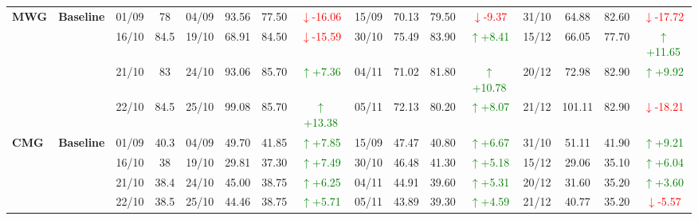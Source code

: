 \documentclass{ieeeaccess}
\begin{document}
{\begin{longtable}{llcc|cccc|cccc|cccc}
\multirow{4}{*}{\textbf{MWG}}
& \textbf{Baseline}
& 01/09 & 78 & 04/09 & 93.56 & 77.50 & \textcolor{red}{\(\downarrow\)-16.06} & 15/09 & 70.13 & 79.50 & \textcolor{red}{\(\downarrow\)-9.37} & 31/10 & 64.88 & 82.60 & \textcolor{red}{\(\downarrow\)-17.72} \\
& & 16/10 & 84.5 & 19/10 & 68.91 & 84.50 & \textcolor{red}{\(\downarrow\)-15.59} & 30/10 & 75.49 & 83.90 & \textcolor{green}{\(\uparrow\)+8.41} & 15/12 & 66.05 & 77.70 & \textcolor{green}{\(\uparrow\)+11.65} \\
& & 21/10 & 83 & 24/10 & 93.06 & 85.70 & \textcolor{green}{\(\uparrow\)+7.36} & 04/11 & 71.02 & 81.80 & \textcolor{green}{\(\uparrow\)+10.78} & 20/12 & 72.98 & 82.90 & \textcolor{green}{\(\uparrow\)+9.92} \\
& & 22/10 & 84.5 & 25/10 & 99.08 & 85.70 & \textcolor{green}{\(\uparrow\)+13.38} & 05/11 & 72.13 & 80.20 & \textcolor{green}{\(\uparrow\)+8.07} & 21/12 & 101.11 & 82.90 & \textcolor{red}{\(\downarrow\)-18.21} \\
\midrule

\multirow{4}{*}{\textbf{CMG}}
& \textbf{Baseline}
& 01/09 & 40.3 & 04/09 & 49.70 & 41.85 & \textcolor{green}{\(\uparrow\)+7.85} & 15/09 & 47.47 & 40.80 & \textcolor{green}{\(\uparrow\)+6.67} & 31/10 & 51.11 & 41.90 & \textcolor{green}{\(\uparrow\)+9.21} \\
& & 16/10 & 38 & 19/10 & 29.81 & 37.30 & \textcolor{green}{\(\uparrow\)+7.49} & 30/10 & 46.48 & 41.30 & \textcolor{green}{\(\uparrow\)+5.18} & 15/12 & 29.06 & 35.10 & \textcolor{green}{\(\uparrow\)+6.04} \\
& & 21/10 & 38.4 & 24/10 & 45.00 & 38.75 & \textcolor{green}{\(\uparrow\)+6.25} & 04/11 & 44.91 & 39.60 & \textcolor{green}{\(\uparrow\)+5.31} & 20/12 & 31.60 & 35.20 & \textcolor{green}{\(\uparrow\)+3.60} \\
& & 22/10 & 38.5 & 25/10 & 44.46 & 38.75 & \textcolor{green}{\(\uparrow\)+5.71} & 05/11 & 43.89 & 39.30 & \textcolor{green}{\(\uparrow\)+4.59} & 21/12 & 40.77 & 35.20 & \textcolor{red}{\(\downarrow\)-5.57} \\
\midrule


\end{longtable}}
\end{document}
